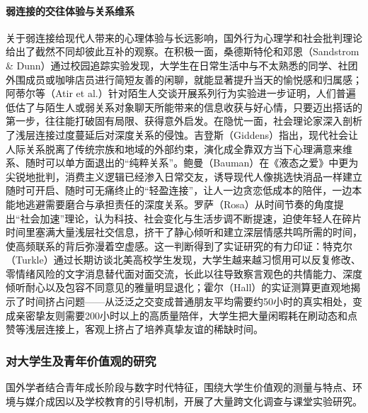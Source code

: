\paragraph{弱连接的交往体验与关系维系}
关于弱连接给现代人带来的心理体验与长远影响，国外行为心理学和社会批判理论给出了截然不同却彼此互补的观察。在积极一面，桑德斯特伦和邓恩（Sandstrom \& Dunn）通过校园追踪实验发现，大学生在日常生活中与不太熟悉的同学、社团外围成员或咖啡店员进行简短友善的闲聊，就能显著提升当天的愉悦感和归属感\cite{Sandstrom2014}；阿蒂尔等（Atir et al.）针对陌生人交谈开展系列行为实验进一步证明，人们普遍低估了与陌生人或弱关系对象聊天所能带来的信息收获与好心情，只要迈出搭话的第一步，往往能打破固有局限、获得意外启发\cite{doi:10.1073/pnas.2206992119}。在隐忧一面，社会理论家深入剖析了浅层连接过度蔓延后对深度关系的侵蚀。吉登斯（Giddens）指出，现代社会让人际关系脱离了传统宗族和地域的外部约束，演化成全靠双方当下心理满意来维系、随时可以单方面退出的“纯粹关系”\cite{Giddens1998}。鲍曼（Bauman）在《液态之爱》中更为尖锐地批判，消费主义逻辑已经渗入日常交友，诱导现代人像挑选快消品一样建立随时可开启、随时可无痛终止的“轻盈连接”，让人一边贪恋低成本的陪伴，一边本能地逃避需要磨合与承担责任的深度关系\cite{Bauman2003}。罗萨（Rosa）从时间节奏的角度提出“社会加速”理论，认为科技、社会变化与生活步调不断提速，迫使年轻人在碎片时间里塞满大量浅层社交信息，挤干了静心倾听和建立深层情感共鸣所需的时间，使高频联系的背后弥漫着空虚感\cite{Rosa2015}。这一判断得到了实证研究的有力印证：特克尔（Turkle）通过长期访谈北美高校学生发现，大学生越来越习惯用可以反复修改、零情绪风险的文字消息替代面对面交流，长此以往导致察言观色的共情能力、深度倾听耐心以及包容不同意见的雅量明显退化\cite{Turkle2015}；霍尔（Hall）的实证测算更直观地揭示了时间挤占问题——从泛泛之交变成普通朋友平均需要约50小时的真实相处，变成亲密挚友则需要200小时以上的高质量陪伴，大学生把大量闲暇耗在刷动态和点赞等浅层连接上，客观上挤占了培养真挚友谊的稀缺时间\cite{Hall2019}。

\subsubsection{对大学生及青年价值观的研究}

国外学者结合青年成长阶段与数字时代特征，围绕大学生价值观的测量与特点、环境与媒介成因以及学校教育的引导机制，开展了大量跨文化调查与课堂实验研究。

